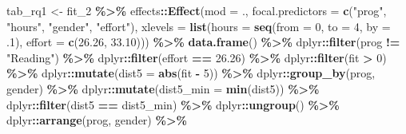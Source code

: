 \documentclass[
]{article}
\newenvironment{Shaded}{\begin{snugshade}}{\end{snugshade}}
\newcommand{\AttributeTok}[1]{\textcolor[rgb]{0.13,0.29,0.53}{#1}}
\newcommand{\DecValTok}[1]{\textcolor[rgb]{0.00,0.00,0.81}{#1}}
\newcommand{\FloatTok}[1]{\textcolor[rgb]{0.00,0.00,0.81}{#1}}
\newcommand{\FunctionTok}[1]{\textcolor[rgb]{0.13,0.29,0.53}{\textbf{#1}}}
\newcommand{\NormalTok}[1]{#1}
\newcommand{\OtherTok}[1]{\textcolor[rgb]{0.56,0.35,0.01}{#1}}
\newcommand{\SpecialCharTok}[1]{\textcolor[rgb]{0.81,0.36,0.00}{\textbf{#1}}}
\newcommand{\StringTok}[1]{\textcolor[rgb]{0.31,0.60,0.02}{#1}}
\begin{document}
\begin{Shaded}
\begin{Highlighting}[]
\NormalTok{tab\_rq1 }\OtherTok{\textless{}{-}}\NormalTok{ fit\_2 }\SpecialCharTok{\%\textgreater{}\%} 
\NormalTok{  effects}\SpecialCharTok{::}\FunctionTok{Effect}\NormalTok{(}\AttributeTok{mod =}\NormalTok{ .,}
                  \AttributeTok{focal.predictors =} \FunctionTok{c}\NormalTok{(}\StringTok{"prog"}\NormalTok{, }\StringTok{"hours"}\NormalTok{, }
                                       \StringTok{"gender"}\NormalTok{, }\StringTok{"effort"}\NormalTok{),}
                  \AttributeTok{xlevels =} \FunctionTok{list}\NormalTok{(}\AttributeTok{hours =} \FunctionTok{seq}\NormalTok{(}\AttributeTok{from =} \DecValTok{0}\NormalTok{,}
                                             \AttributeTok{to =} \DecValTok{4}\NormalTok{,}
                                             \AttributeTok{by =}\NormalTok{ .}\DecValTok{1}\NormalTok{),}
                                 \AttributeTok{effort =} \FunctionTok{c}\NormalTok{(}\FloatTok{26.26}\NormalTok{, }\FloatTok{33.10}\NormalTok{))) }\SpecialCharTok{\%\textgreater{}\%} 
  \FunctionTok{data.frame}\NormalTok{() }\SpecialCharTok{\%\textgreater{}\%} 
\NormalTok{  dplyr}\SpecialCharTok{::}\FunctionTok{filter}\NormalTok{(prog }\SpecialCharTok{!=} \StringTok{"Reading"}\NormalTok{) }\SpecialCharTok{\%\textgreater{}\%} 
\NormalTok{  dplyr}\SpecialCharTok{::}\FunctionTok{filter}\NormalTok{(effort }\SpecialCharTok{==} \FloatTok{26.26}\NormalTok{) }\SpecialCharTok{\%\textgreater{}\%} 
\NormalTok{  dplyr}\SpecialCharTok{::}\FunctionTok{filter}\NormalTok{(fit }\SpecialCharTok{\textgreater{}} \DecValTok{0}\NormalTok{) }\SpecialCharTok{\%\textgreater{}\%} 
\NormalTok{  dplyr}\SpecialCharTok{::}\FunctionTok{mutate}\NormalTok{(}\AttributeTok{dist5 =} \FunctionTok{abs}\NormalTok{(fit }\SpecialCharTok{{-}} \DecValTok{5}\NormalTok{)) }\SpecialCharTok{\%\textgreater{}\%} 
\NormalTok{  dplyr}\SpecialCharTok{::}\FunctionTok{group\_by}\NormalTok{(prog, gender) }\SpecialCharTok{\%\textgreater{}\%} 
\NormalTok{  dplyr}\SpecialCharTok{::}\FunctionTok{mutate}\NormalTok{(}\AttributeTok{dist5\_min =} \FunctionTok{min}\NormalTok{(dist5)) }\SpecialCharTok{\%\textgreater{}\%} 
\NormalTok{  dplyr}\SpecialCharTok{::}\FunctionTok{filter}\NormalTok{(dist5 }\SpecialCharTok{==}\NormalTok{ dist5\_min) }\SpecialCharTok{\%\textgreater{}\%} 
\NormalTok{  dplyr}\SpecialCharTok{::}\FunctionTok{ungroup}\NormalTok{() }\SpecialCharTok{\%\textgreater{}\%} 
\NormalTok{  dplyr}\SpecialCharTok{::}\FunctionTok{arrange}\NormalTok{(prog, gender) }\SpecialCharTok{\%\textgreater{}\%} 

\end{Highlighting}
\end{Shaded}
\end{document}
